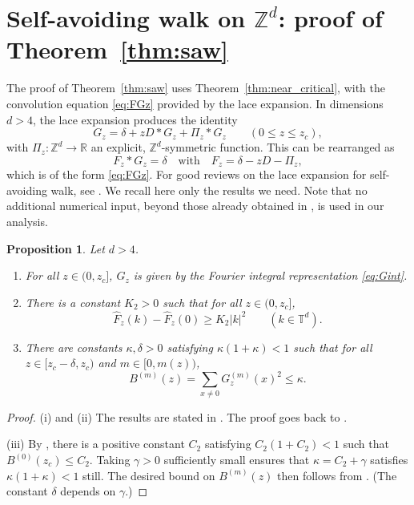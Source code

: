 \documentclass[11pt,hidelinks]{article}
\theoremstyle{plain}
\newtheorem{proposition}[theorem]{Proposition}
\numberwithin{equation}{section}
\newcommand{\Z}{\mathbb{Z}}
\newcommand{\R}{\mathbb{R}}
\newcommand{\T}{\mathbb{T}}
\renewcommand{\(}{\left(}
\renewcommand{\)}{\right)}
\newcommand{\1}{\mathds{1}}
\providecommand{\abs}[1]{\lvert#1\rvert}
\newcommand{\mz}{m(z)}
\newcommand{\supm}{^{(m)}}
\begin{document}
\section{Self-avoiding walk on $\Z^d$: proof of Theorem~\ref{thm:saw}}
\label{sec:saw}

The proof of Theorem~\ref{thm:saw} uses Theorem~\ref{thm:near_critical}, with the convolution equation \eqref{eq:FGz} provided by the lace expansion. 
In dimensions $d>4$, the lace expansion \cite{BS85, Slad06} produces the identity
\begin{equation}
\label{eq:conv_saw}
G_z = \delta + zD * G_z + \Pi_z * G_z
\qquad (0 \le z \le z_c),
\end{equation}
with $\Pi_z : \Z^d \to \R$ an explicit, $\Z^d$-symmetric function. This can be rearranged as 
\begin{equation} \label{eq:def_Fz}
F_z * G_z = \delta
\quad\text{with}\quad
F_z = \delta -zD - \Pi_z,
\end{equation}
which is of the form \eqref{eq:FGz}. 
For good reviews on the lace expansion for self-avoiding walk, see \cite{MS93, Slad06}. 
We recall here only the results we need.
Note that no additional numerical input, beyond those already obtained in \cite{HS92b}, is used in our analysis.
\begin{proposition} \label{prop:lace}
Let $d >4$.
\begin{enumerate}[label=(\roman*)]
\item
For all $z \in (0, z_c]$, $G_z$ is given by the Fourier integral representation \eqref{eq:Gint}. 

\item 
There is a constant $K_2 > 0$ such that for all $z \in (0, z_c]$, 
\begin{equation}
\hat F_z(k) - \hat F_z(0) \ge K_2 \abs k^2
\qquad (k\in \T^d).
\end{equation}


\item
There are constants $\kappa, \delta >0$ 
satisfying $\kappa(1+\kappa) <1$
such that for all $z \in [z_c - \delta, z_c )$ and $m\in [0, \mz)$, 
\begin{equation} \label{eq:bubble^m}
B\supm(z) = \sum_{x\ne 0} G_z\supm(x)^2 \le \kappa. 
\end{equation}

\end{enumerate}
\end{proposition}

\begin{proof}
(i) and (ii) The results are stated in \cite[Proposition~1.3]{Hara08}. The proof goes back to \cite{HS92a,HS92b}. 

\smallskip\noindent
(iii) By \cite[Theorem~2.5]{HS92a}, there is a positive constant $C_2$ satisfying $C_2(1+C_2) < 1$ such that $B^{(0)}(z_c) \le C_2$.
Taking $\gamma >0$ sufficiently small ensures that $\kappa = C_2 + \gamma$ satisfies $\kappa(1+\kappa) < 1$ still.
The desired bound on $B\supm(z)$ then follows from \cite[Lemma~3.10]{HS92a}. (The constant $\delta$ depends on $\gamma$.)
\end{proof}
\end{document}
